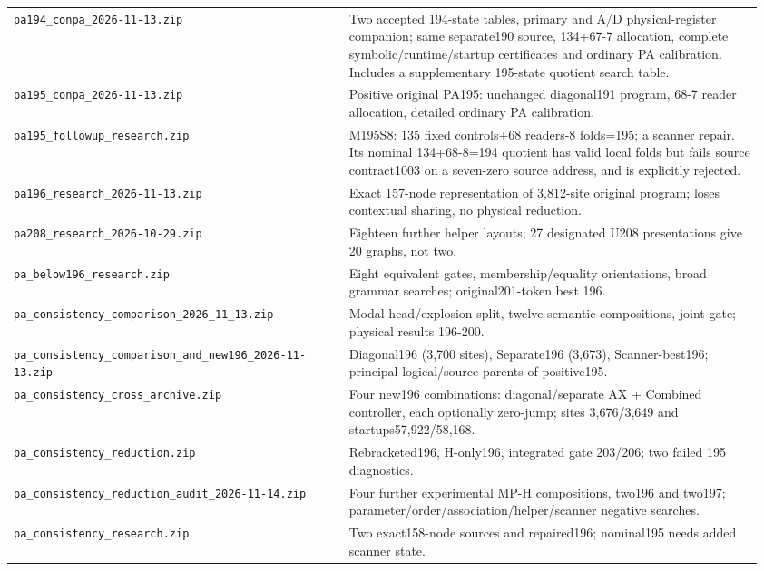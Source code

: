 \begin{longtable}{@{}p{0.43\linewidth}p{0.53\linewidth}@{}}
\nolinkurl{pa194_conpa_2026-11-13.zip} & Two accepted 194-state tables, primary and A/D physical-register companion; same separate190 source, 134+67-7 allocation, complete symbolic/runtime/startup certificates and ordinary PA calibration. Includes a supplementary 195-state quotient search table.\\[4pt]
\nolinkurl{pa195_conpa_2026-11-13.zip} & Positive original PA195: unchanged diagonal191 program, 68-7 reader allocation, detailed ordinary PA calibration.\\[4pt]
\nolinkurl{pa195_followup_research.zip} & M195S8: 135 fixed controls+68 readers-8 folds=195; a scanner repair. Its nominal 134+68-8=194 quotient has valid local folds but fails source contract1003 on a seven-zero source address, and is explicitly rejected.\\[4pt]
\nolinkurl{pa196_research_2026-11-13.zip} & Exact 157-node representation of 3,812-site original program; loses contextual sharing, no physical reduction.\\[4pt]
\nolinkurl{pa208_research_2026-10-29.zip} & Eighteen further helper layouts; 27 designated U208 presentations give 20 graphs, not two.\\[4pt]
\nolinkurl{pa_below196_research.zip} & Eight equivalent gates, membership/equality orientations, broad grammar searches; original201-token best 196.\\[4pt]
\nolinkurl{pa_consistency_comparison_2026_11_13.zip} & Modal-head/explosion split, twelve semantic compositions, joint gate; physical results 196-200.\\[4pt]
\nolinkurl{pa_consistency_comparison_and_new196_2026-11-13.zip} & Diagonal196 (3,700 sites), Separate196 (3,673), Scanner-best196; principal logical/source parents of positive195.\\[4pt]
\nolinkurl{pa_consistency_cross_archive.zip} & Four new196 combinations: diagonal/separate AX + Combined controller, each optionally zero-jump; sites 3,676/3,649 and startups57,922/58,168.\\[4pt]
\nolinkurl{pa_consistency_reduction.zip} & Rebracketed196, H-only196, integrated gate 203/206; two failed 195 diagnostics.\\[4pt]
\nolinkurl{pa_consistency_reduction_audit_2026-11-14.zip} & Four further experimental MP-H compositions, two196 and two197; parameter/order/association/helper/scanner negative searches.\\[4pt]
\nolinkurl{pa_consistency_research.zip} & Two exact158-node sources and repaired196; nominal195 needs added scanner state.\\[4pt]

\end{longtable}
